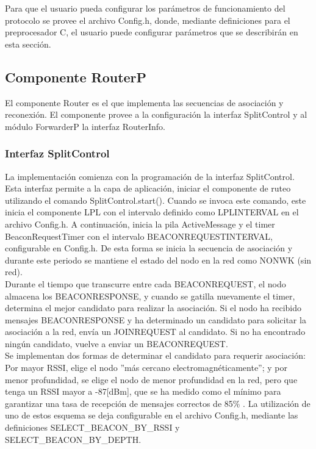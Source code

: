 Para que el usuario pueda configurar los parámetros de funcionamiento del protocolo se provee el archivo Config.h, donde, mediante definiciones para el preprocesador C, el usuario puede configurar parámetros que se describirán en esta sección.

\subsection{Componente RouterP}
El componente Router es el que implementa las secuencias de asociación y reconexión. El componente provee a la configuración la interfaz SplitControl y al módulo ForwarderP la interfaz RouterInfo.

\subsubsection{Interfaz SplitControl}
La implementación comienza con la programación de la interfaz SplitControl. Esta interfaz permite a la capa de aplicación, iniciar el componente de ruteo utilizando el comando SplitControl.start(). Cuando se invoca este comando, este inicia el componente LPL con el intervalo definido como LPL\textunderscore INTERVAL en el archivo Config.h. A continuación, inicia la pila ActiveMessage y el timer BeaconRequestTimer con el intervalo BEACON\textunderscore REQUEST\textunderscore INTERVAL, configurable en Config.h. De esta forma se inicia la secuencia de asociación y durante este periodo se mantiene el estado del nodo en la red como NO\textunderscore NWK (sin red). \\

Durante el tiempo que transcurre entre cada BEACON\textunderscore REQUEST, el nodo almacena los BEACON\textunderscore RESPONSE, y cuando se gatilla nuevamente el timer, determina el mejor candidato para realizar la asociación. Si el nodo ha recibido mensajes BEACON\textunderscore RESPONSE y ha determinado un candidato para solicitar la asociación a la red, envía un JOIN\textunderscore REQUEST al candidato. Si no ha encontrado ningún candidato, vuelve a enviar un BEACON\textunderscore REQUEST.\\

Se implementan dos formas de determinar el candidato para requerir asociación: Por mayor RSSI, elige el nodo ''más cercano electromagnéticamente''; y por menor profundidad, se elige el nodo de menor profundidad en la red, pero que tenga un RSSI mayor a -87[dBm], que se ha medido como el mínimo para garantizar una tasa de recepción de mensajes correctos de 85\%  \cite{RSSIUnder}. La utilización de uno de estos esquema se deja configurable en el archivo Config.h, mediante las definiciones SELECT\_BEACON\_BY\_RSSI y SELECT\_BEACON\_BY\_DEPTH. \\

